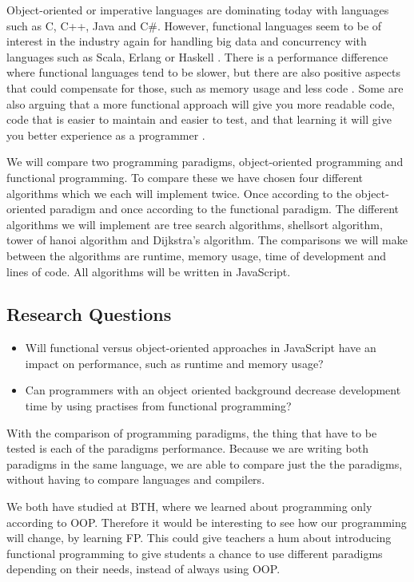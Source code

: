 \documentclass {article}
\begin{document}
Object-oriented or imperative languages are dominating today with languages such as C, C++, Java and C\#. However, functional languages seem to be of interest in the industry again for handling big data and concurrency with languages such as Scala, Erlang or Haskell \cite{drboolean, eriksen, erikarl}. There is a performance difference where functional languages tend to be slower, but there are also positive aspects that could compensate for those, such as memory usage and less code \cite{fogus, alomgi}.  Some are also arguing that a more functional approach will give you more readable code, code that is easier to maintain and easier to test, and that learning it will give you better experience as a programmer \cite{drboolean, meijer}. 

We will compare two programming paradigms, object-oriented programming and functional programming. To compare these we have chosen four different algorithms which we each will implement twice. Once according to the object-oriented paradigm and once according to the functional paradigm. The different algorithms we will implement are tree search algorithms, shellsort algorithm, tower of hanoi algorithm and Dijkstra's algorithm. The comparisons we will make between the algorithms are runtime, memory usage, time of development and lines of code. All algorithms will be written in JavaScript.
\subsection{Research Questions}
\begin{itemize}
\item Will functional versus object-oriented approaches in JavaScript have an impact on performance, such as runtime and memory usage?
\item Can programmers with an object oriented background decrease development time by using practises from functional programming?
\end{itemize}

With the comparison of programming paradigms, the thing that have to be tested is each of the paradigms performance. Because we are writing both paradigms in the same language, we are able to compare just the the paradigms, without having to compare languages and compilers.

We both have studied at BTH, where we learned about programming only according to OOP. Therefore it would be interesting to see how our programming will change, by learning FP. This could give teachers a hum about introducing functional programming to give students a chance to use different paradigms depending on their needs, instead of always using OOP.
\end{document}
